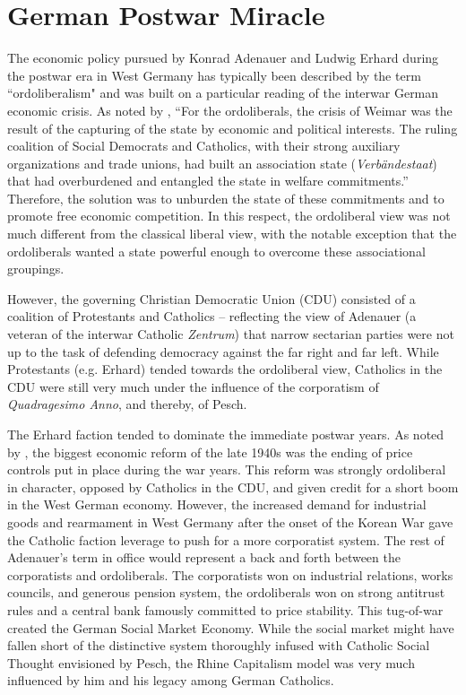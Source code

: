 \documentclass{article}
\begin{document}
\section{German Postwar Miracle}

The economic policy pursued by Konrad Adenauer and Ludwig Erhard during the postwar era in West Germany has typically been described by the term ``ordoliberalism" and was built on a particular reading of the interwar German economic crisis.  As noted by \citet[p. 351]{hien2013}, “For the ordoliberals, the crisis of Weimar was the result of the capturing of the state by economic and political interests.  The ruling coalition of Social Democrats and Catholics, with their strong auxiliary organizations and trade unions, had built an association state (\emph{Verb\"{a}ndestaat}) that had overburdened and entangled the state in welfare commitments.”  Therefore, the solution was to unburden the state of these commitments and to promote free economic competition.  In this respect, the ordoliberal view was not much different from the classical liberal view, with the notable exception that the ordoliberals wanted a state powerful enough to overcome these associational groupings.\medskip

However, the governing Christian Democratic Union (CDU) consisted of a coalition of Protestants and Catholics – reflecting the view of Adenauer (a veteran of the interwar Catholic \emph{Zentrum}) that narrow sectarian parties were not up to the task of defending democracy against the far right and far left.  While Protestants (e.g. Erhard) tended towards the ordoliberal view, Catholics in the CDU were still very much under the influence of the corporatism of \emph{Quadragesimo Anno}, and thereby, of Pesch.\medskip

The Erhard faction tended to dominate the immediate postwar years.  As noted by \citet{hien2013}, the biggest economic reform of the late 1940s was the ending of price controls put in place during the war years.  This reform was strongly ordoliberal in character, opposed by Catholics in the CDU, and given credit for a short boom in the West German economy.  However, the increased demand for industrial goods and rearmament in West Germany after the onset of the Korean War gave the Catholic faction leverage to push for a more corporatist system.  The rest of Adenauer’s term in office would represent a back and forth between the corporatists and ordoliberals.  The corporatists won on industrial relations, works councils, and generous pension system, the ordoliberals won on strong antitrust rules and a central bank famously committed to price stability.  This tug-of-war created the German Social Market Economy.  While the social market might have fallen short of the distinctive system thoroughly infused with Catholic Social Thought envisioned by Pesch, the Rhine Capitalism model was very much influenced by him and his legacy among German Catholics.
\end{document}
